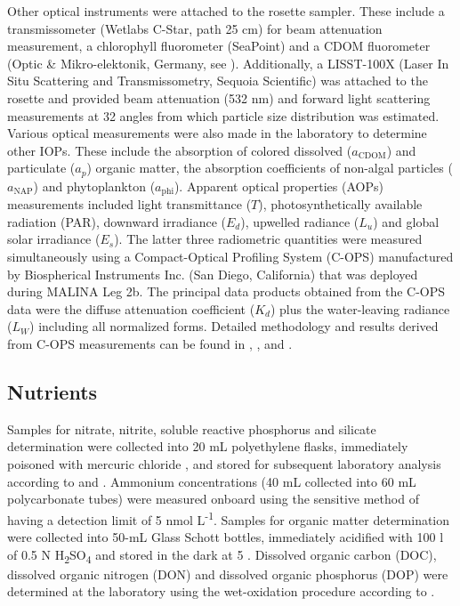 \documentclass[essd, manuscript]{copernicus}
\begin{document}
Other optical instruments were attached to the rosette sampler. These include a transmissometer (Wetlabs C-Star, path 25 cm) for beam attenuation measurement, a chlorophyll fluorometer (SeaPoint) and a CDOM fluorometer (Optic \& Mikro-elektonik, Germany, see \citet{Amon2003}). Additionally, a LISST-100X (Laser In Situ Scattering and Transmissometry, Sequoia Scientific) was attached to the rosette and provided beam attenuation (532 nm) and forward light scattering measurements at 32 angles from which particle size distribution was estimated. Various optical measurements were also made in the laboratory to determine other IOPs. These include the absorption of colored dissolved ($a_\text{CDOM}$) and particulate ($a_p$) organic matter, the absorption coefficients of non-algal particles ($a_\text{NAP}$) and phytoplankton ($a_\text{phi}$). Apparent optical properties (AOPs) measurements included light transmittance ($T$), photosynthetically available radiation (PAR), downward irradiance ($E_d$), upwelled radiance ($L_u$) and global solar irradiance ($E_s$). The latter three radiometric quantities were measured simultaneously using a Compact-Optical Profiling System (C-OPS) manufactured by Biospherical Instruments Inc. (San Diego, California) that was deployed during MALINA Leg 2b. The principal data products obtained from the C-OPS data were the diffuse attenuation coefficient ($K_d$) plus the water-leaving radiance ($L_W$) including all normalized forms. Detailed methodology and results derived from C-OPS measurements can be found in \citet{Doxaran2012},  \citet{Antoine2013}, \citet{Belanger2013b} and \citet{Hooker2013}.

\subsection{Nutrients}

Samples for nitrate, nitrite, soluble reactive phosphorus and silicate determination were collected into 20 mL polyethylene flasks, immediately poisoned with mercuric chloride \citep{Kirkwood1992}, and stored for subsequent laboratory analysis according to \citet{Raimbault1990} and \citet{Aminot2007}. Ammonium concentrations (40 mL collected into 60 mL polycarbonate tubes) were measured onboard using the sensitive method of \citet{Holmes1999} having a detection limit of 5 nmol L\textsuperscript{-1}. Samples for organic matter determination were collected into 50-mL Glass Schott bottles, immediately acidified with 100 \textmu l of 0.5 N H\textsubscript{2}SO\textsubscript{4}  and stored in the dark at 5 \textcelsius. Dissolved organic carbon (DOC), dissolved organic nitrogen (DON) and dissolved organic phosphorus (DOP) were determined at the laboratory using the wet-oxidation procedure according to \citet{Raimbault1999a}.
\end{document}

